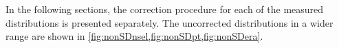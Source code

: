In the following sections, the correction procedure   for each of the measured distributions is presented separately.
The uncorrected distributions in a wider range  are shown in \cref{fig:nonSDnsel,fig:nonSDpt,fig:nonSDera}.





